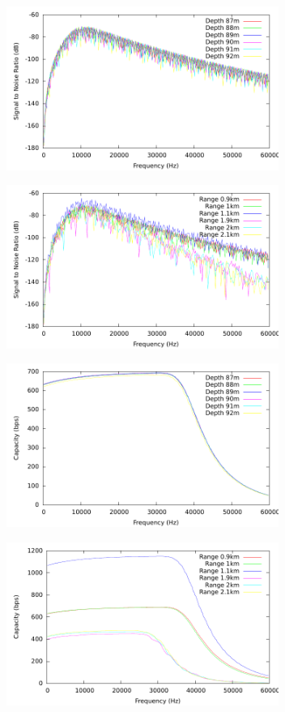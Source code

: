 \documentclass[a4paper]{IEEEtran}
\begin{document}
\begin{figure}
\centering
\includegraphics[width=3.5in]{../postprocessing/sig2noiseDepth.pdf}
\end{figure}

\begin{figure}
\centering
\includegraphics[width=3.5in]{../postprocessing/sig2noiseRange.pdf}
\end{figure}

\begin{figure}
\centering
\includegraphics[width=3.5in]{../postprocessing/capacityDepth.pdf}
\end{figure}

\begin{figure}
\centering
\includegraphics[width=3.5in]{../postprocessing/capacityRange.pdf}
\end{figure}
\end{document}
